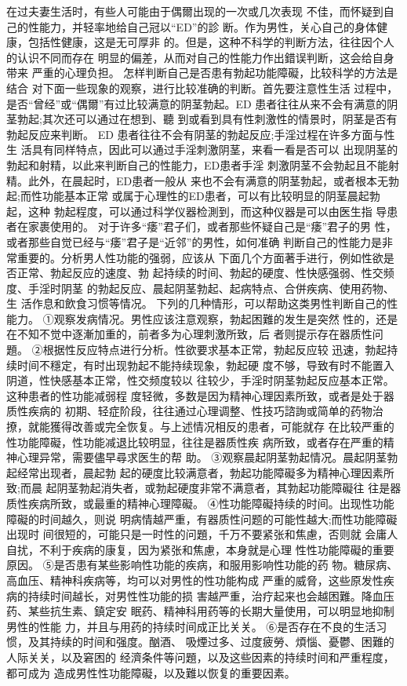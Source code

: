 \documentclass[12pt,UTF8]{ctexbook}
\begin{document}
在过夫妻生活时，有些人可能由于偶爾出现的一次或几次表现
不佳，而怀疑到自己的性能力，并轻率地给自己冠以“ED”的診
断。作为男性，关心自己的身体健康，包括性健康，这是无可厚非
的。但是，这种不科学的判断方法，往往因个人的认识不同而存在
明显的偏差，从而对自己的性能力作出錯误判断，这会给自身带来
严重的心理负担。
怎样判断自己是否患有勃起功能障礙，比较科学的方法是结合
对下面一些现象的观察，进行比较准确的判断。首先要注意性生活
过程中，是否“曾经”或“偶爾”有过比较满意的阴茎勃起。ED
患者往往从来不会有满意的阴茎勃起;其次还可以通过在想到、聽
到或看到具有性刺激性的情景时，阴茎是否有勃起反应来判断。
ED 患者往往不会有阴茎的勃起反应;手淫过程在许多方面与性生
活具有同样特点，因此可以通过手淫刺激阴茎，来看一看是否可以
出现阴茎的勃起和射精，以此来判断自己的性能力，ED患者手淫
刺激阴茎不会勃起且不能射精。此外，在晨起时，ED患者一般从
来也不会有满意的阴茎勃起，或者根本无勃起;而性功能基本正常
或属于心理性的ED患者，可以有比较明显的阴茎晨起勃起，这种
勃起程度，可以通过科学仪器检測到，而这种仪器是可以由医生指
导患者在家裹使用的。
对于许多“痿”君子们，或者那些怀疑自己是“痿”君子的男
性，或者那些自觉已经与“痿”君子是“近邻”的男性，如何准确
判断自己的性能力是非常重要的。分析男人性功能的强弱，应该从
下面几个方面著手进行，例如性欲是否正常、勃起反应的速度、勃
起持续的时间、勃起的硬度、性快感强弱、性交频度、手淫时阴茎
的勃起反应、晨起阴茎勃起、起病特点、合併疾病、使用药物、生
活作息和飲食习惯等情况。
下列的几种情形，可以帮助这类男性判断自己的性能力。
①观察发病情况。男性应该注意观察，勃起困難的发生是突然
性的，还是在不知不觉中逐漸加重的，前者多为心理刺激所致，后
者则提示存在器质性问題。
②根据性反应特点进行分析。性欲要求基本正常，勃起反应较
迅速，勃起持续时间不穩定，有时出现勃起不能持续现象，勃起硬
度不够，导致有时不能置入阴道，性快感基本正常，性交频度较以
往较少，手淫时阴茎勃起反应基本正常。这种患者的性功能减弱程
度轻微，多数是因为精神心理因素所致，或者是处于器质性疾病的
初期、轻症阶段，往往通过心理调整、性技巧諮詢或简单的药物治
撩，就能獲得改善或完全恢复。与上述情况相反的患者，可能就存
在比较严重的性功能障礙，性功能减退比较明显，往往是器质性疾
病所致，或者存在严重的精神心理异常，需要儘早尋求医生的帮
助。
③观察晨起阴茎勃起情况。晨起阴茎勃起经常出现者，晨起勃
起的硬度比较满意者，勃起功能障礙多为精神心理因素所致;而晨
起阴茎勃起消失者，或勃起硬度非常不满意者，其勃起功能障礙往
往是器质性疾病所致，或最重的精神心理障礙。
④性功能障礙持续的时间。出现性功能障礙的时间越久，则说
明病情越严重，有器质性问题的可能性越大;而性功能障礙出现时
间很短的，可能只是一时性的问題，千万不要紧张和焦慮，否则就
会庸人自扰，不利于疾病的康复，因为紧张和焦慮，本身就是心理
性性功能障礙的重要原因。
⑤是否患有某些影响性功能的疾病，和服用影响性功能的药
物。糖尿病、高血压、精神科疾病等，均可以对男性的性功能构成
严重的威脅，这些原发性疾病的持续时间越长，对男性性功能的损
害越严重，治疗起来也会越困難。降血压药、某些抗生素、鎮定安
眠药、精神科用药等的长期大量使用，可以明显地抑制男性的性能
力，并且与用药的持续时间成正比关关。
⑥是否存在不良的生活习惯，及其持续的时间和强度。酗酒、
吸煙过多、过度疲勞、煩惱、憂鬱、困難的人际关关，以及窘困的
经濟条件等问題，以及这些因素的持续时间和严重程度，都可成为
造成男性性功能障礙，以及難以恢复的重要因素。
\end{document}
